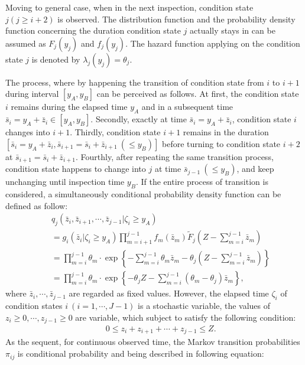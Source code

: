 Moving to general case, when in the next inspection, condition state $j(j\geq i +2)$ is observed. The distribution function and the probability density function concerning the duration condition state $j$ actually stays in can be assumed as $F_j(y_j) $ and $f_j(y_j)$. The hazard function applying on the condition state $j$ is denoted by $\lambda_j(y_j) =\theta_j$. 

The process, where by happening the transition of condition state from $i$ to $i+1$ during interval $[y_A,y_B]$ can be perceived as follows. At first, the condition state $i$ remains during the elapsed time $y_A$ and in a subsequent time $\bar{s}_i=y_A+\bar{z}_i \in [y_A,y_B]$. Secondly, exactly at time $\bar{s}_i=y_A+\bar{z}_i$, condition state $i$ changes into $i+1$. Thirdly, condition state $i+1$ remains in the duration $[\bar{s}_i=y_A+\bar{z}_i, \bar{s}_{i+1}=\bar{s}_{i}+\bar{z}_{i+1}~(\leq y_B)]$ before turning to condition state $i+2$ at $\bar{s}_{i+1}=\bar{s}_{i}+\bar{z}_{i+1}$. Fourthly, after repeating the same transition process, condition state happens to change into $j$ at time $\bar{s}_{j-1}~(\leq y_B)$, and keep unchanging until inspection time $y_B$. If the entire process of transition is considered, a simultaneously conditional probability density function can be defined as follow:
\begin{eqnarray}
&& q_{j}(\bar{z}_i,\bar{z}_{i+1},\cdots,\bar{z}_{j-1}|\zeta_i\geq y_A) \nonumber \\
&& = g_i(\bar{z}_i|\zeta_i \geq y_A) \prod_{m=i+1}^{j-1} f_{m}(\bar{z}_m) \tilde{F}_{j}\left(Z-\sum_{m=i}^{j-1} \bar{z}_m\right)
\nonumber\\
&& = \prod_{m=i}^{j-1}\theta_m\cdot \exp\left\{- \sum_{m=i}^{j-1} \theta_m \bar{z}_m -\theta_{j}(Z-\sum_{m=i}^{j-1} \bar{z}_m)\right\}\nonumber \\
&& = \prod_{m=i}^{j-1}\theta_m \cdot \exp\left\{-\theta_j Z - \sum_{m=i}^{j-1} (\theta_m-\theta_{j})\bar{z}_m\right\},
\end{eqnarray}
where $\bar{z}_i,\cdots,\bar{z}_{j-1}$ are regarded as fixed values. However, the elapsed time $\zeta_i$ of condition states $i~(i=1,\cdots,J-1)$ is a stochastic variable, the values of $z_i\geq 0,\cdots,z_{j-1}\geq 0$ are variable, which subject to satisfy the following condition:
\begin{eqnarray}
&& 0\leq z_i+z_{i+1}+\cdots+z_{j-1}\leq Z.
\end{eqnarray}
As the sequent, for continuous observed time, the Markov transition probabilities $\pi_{ij}$ is conditional probability and being described in following equation:
